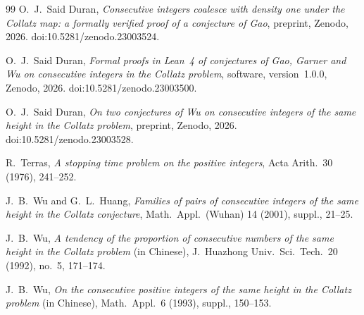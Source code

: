 \documentclass[11pt]{amsart}
\theoremstyle{definition}
\theoremstyle{remark}
\begin{document}
\begin{thebibliography}{99}
 O.~J.~Said Duran, \emph{Consecutive integers coalesce with density one under the Collatz map: a formally verified proof of a conjecture of Gao}, preprint, Zenodo, 2026. doi:10.5281/zenodo.23003524.

 O.~J.~Said Duran, \emph{Formal proofs in Lean~4 of conjectures of Gao, Garner and Wu on consecutive integers in the Collatz problem}, software, version~1.0.0, Zenodo, 2026. doi:10.5281/zenodo.23003500.

 O.~J.~Said Duran, \emph{On two conjectures of Wu on consecutive integers of the same height in the Collatz problem}, preprint, Zenodo, 2026. doi:10.5281/zenodo.23003528.

 R.~Terras, \emph{A stopping time problem on the positive integers}, Acta Arith.\ 30 (1976), 241--252.

 J.~B.~Wu and G.~L.~Huang, \emph{Families of pairs of consecutive integers of the same height in the Collatz conjecture}, Math.\ Appl.\ (Wuhan) 14 (2001), suppl., 21--25.

 J.~B.~Wu, \emph{A tendency of the proportion of consecutive numbers of the same height in the Collatz problem} (in Chinese), J.~Huazhong Univ.\ Sci.\ Tech.\ 20 (1992), no.~5, 171--174.

 J.~B.~Wu, \emph{On the consecutive positive integers of the same height in the Collatz problem} (in Chinese), Math.\ Appl.\ 6 (1993), suppl., 150--153.

\end{thebibliography}
\end{document}
